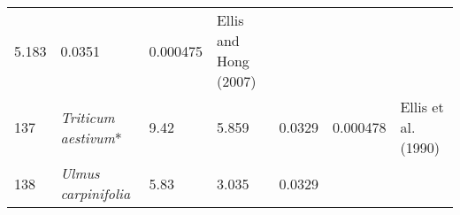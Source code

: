 \documentclass[]{article}
\begin{document}
\begin{longtable}[]{@{}lllllll@{}}
\begin{minipage}[t]{0.08\columnwidth}
5.183\strut
\end{minipage} & \begin{minipage}[t]{0.08\columnwidth}\raggedright
0.0351\strut
\end{minipage} & \begin{minipage}[t]{0.08\columnwidth}\raggedright
0.000475\strut
\end{minipage} & \begin{minipage}[t]{0.23\columnwidth}\raggedright
Ellis and Hong (2007)\strut
\end{minipage}\tabularnewline
\begin{minipage}[t]{0.05\columnwidth}\raggedright
137\strut
\end{minipage} & \begin{minipage}[t]{0.23\columnwidth}\raggedright
\emph{Triticum aestivum}*\strut
\end{minipage} & \begin{minipage}[t]{0.05\columnwidth}\raggedright
9.42\strut
\end{minipage} & \begin{minipage}[t]{0.08\columnwidth}\raggedright
5.859\strut
\end{minipage} & \begin{minipage}[t]{0.08\columnwidth}\raggedright
0.0329\strut
\end{minipage} & \begin{minipage}[t]{0.08\columnwidth}\raggedright
0.000478\strut
\end{minipage} & \begin{minipage}[t]{0.23\columnwidth}\raggedright
Ellis et al. (1990)\strut
\end{minipage}\tabularnewline
\begin{minipage}[t]{0.05\columnwidth}\raggedright
138\strut
\end{minipage} & \begin{minipage}[t]{0.23\columnwidth}\raggedright
\emph{Ulmus carpinifolia}\strut
\end{minipage} & \begin{minipage}[t]{0.05\columnwidth}\raggedright
5.83\strut
\end{minipage} & \begin{minipage}[t]{0.08\columnwidth}\raggedright
3.035\strut
\end{minipage} & \begin{minipage}[t]{0.08\columnwidth}\raggedright
0.0329\strut
\end{minipage} & \begin{minipage}[t]{0.08\columnwidth}\raggedright

\end{minipage}
\end{longtable}
\end{document}
